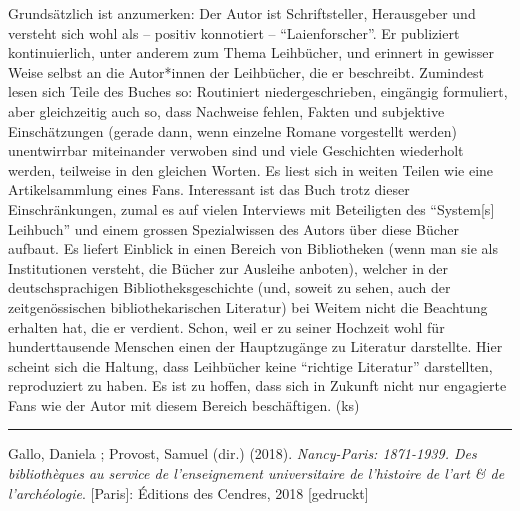 \documentclass[a4paper,
fontsize=11pt,
oneside,
numbers=noperiodatend,
parskip=half-,
bibliography=totoc,
final
]{scrartcl}
\begin{document}
Grundsätzlich ist anzumerken: Der Autor ist Schriftsteller, Herausgeber
und versteht sich wohl als -- positiv konnotiert --
\enquote{Laienforscher}. Er publiziert kontinuierlich, unter anderem zum
Thema Leihbücher, und erinnert in gewisser Weise selbst an die
Autor*innen der Leihbücher, die er beschreibt. Zumindest lesen sich
Teile des Buches so: Routiniert niedergeschrieben, eingängig formuliert,
aber gleichzeitig auch so, dass Nachweise fehlen, Fakten und subjektive
Einschätzungen (gerade dann, wenn einzelne Romane vorgestellt werden)
unentwirrbar miteinander verwoben sind und viele Geschichten wiederholt
werden, teilweise in den gleichen Worten. Es liest sich in weiten Teilen
wie eine Artikelsammlung eines Fans. Interessant ist das Buch trotz
dieser Einschränkungen, zumal es auf vielen Interviews mit Beteiligten
des \enquote{System{[}s{]} Leihbuch} und einem grossen Spezialwissen des
Autors über diese Bücher aufbaut. Es liefert Einblick in einen Bereich
von Bibliotheken (wenn man sie als Institutionen versteht, die Bücher
zur Ausleihe anboten), welcher in der deutschsprachigen
Bibliotheksgeschichte (und, soweit zu sehen, auch der zeitgenössischen
bibliothekarischen Literatur) bei Weitem nicht die Beachtung erhalten
hat, die er verdient. Schon, weil er zu seiner Hochzeit wohl für
hunderttausende Menschen einen der Hauptzugänge zu Literatur darstellte.
Hier scheint sich die Haltung, dass Leihbücher keine \enquote{richtige
Literatur} darstellten, reproduziert zu haben. Es ist zu hoffen, dass
sich in Zukunft nicht nur engagierte Fans wie der Autor mit diesem
Bereich beschäftigen. (ks)

\begin{center}\rule{0.5\linewidth}{0.5pt}\end{center}

Gallo, Daniela ; Provost, Samuel (dir.) (2018). \emph{Nancy-Paris:
1871-1939. Des bibliothèques au service de l'enseignement universitaire
de l'histoire de l'art \& de l'archéologie}. {[}Paris{]}: Éditions des
Cendres, 2018 {[}gedruckt{]}
\end{document}
